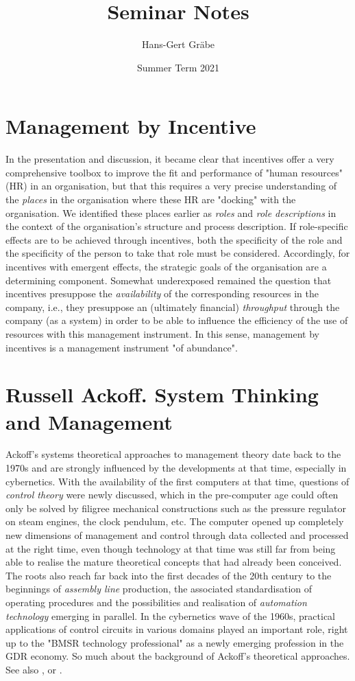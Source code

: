 \documentclass[11pt,a4paper]{article}
\title{Seminar Notes}
\author{Hans-Gert Gr\"abe}
\date{Summer Term 2021}
\begin{document}
\maketitle
\tableofcontents
\newpage

\section{Management by Incentive}

In the presentation and discussion, it became clear that incentives offer a
very comprehensive toolbox to improve the fit and performance of "human
resources" (HR) in an organisation, but that this requires a very precise
understanding of the \emph{places} in the organisation where these HR are
"docking" with the organisation. We identified these places earlier as
\emph{roles} and \emph{role descriptions} in the context of the organisation's
structure and process description. If role-specific effects are to be achieved
through incentives, both the specificity of the role and the specificity of
the person to take that role must be considered. Accordingly, for incentives
with emergent effects, the strategic goals of the organisation are a
determining component. Somewhat underexposed remained the question that
incentives presuppose the \emph{availability} of the corresponding resources
in the company, i.e., they presuppose an (ultimately financial)
\emph{throughput} through the company (as a system) in order to be able to
influence the efficiency of the use of resources with this management
instrument. In this sense, management by incentives is a management instrument
"of abundance".

\section{Russell Ackoff. System Thinking and Management}

Ackoff's systems theoretical approaches to management theory date back to the
1970s and are strongly influenced by the developments at that time, especially
in cybernetics. With the availability of the first computers at that time,
questions of \emph{control theory} were newly discussed, which in the
pre-computer age could often only be solved by filigree mechanical
constructions such as the pressure regulator on steam engines, the clock
pendulum, etc. The computer opened up completely new dimensions of management
and control through data collected and processed at the right time, even
though technology at that time was still far from being able to realise the
mature theoretical concepts that had already been conceived. The roots also
reach far back into the first decades of the 20th century to the beginnings of
\emph{assembly line} production, the associated standardisation of operating
procedures and the possibilities and realisation of \emph{automation
  technology} emerging in parallel. In the cybernetics wave of the 1960s,
practical applications of control circuits in various domains played an
important role, right up to the "BMSR technology professional" as a newly
emerging profession in the GDR economy. So much about the background of
Ackoff's theoretical approaches. See also \cite{Steinbuch1966},
\cite{Steinbuch1971} or \cite{Prigogine1981}.
\end{document}
